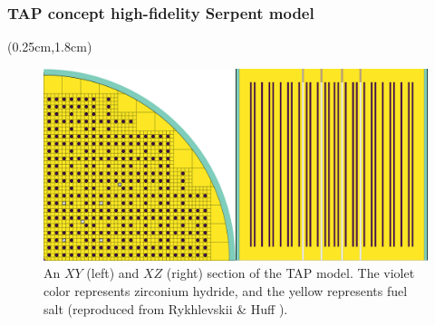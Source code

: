 \begin{frame}
\frametitle{\gls{TAP} concept high-fidelity Serpent model}
\begin{textblock*}{12.25cm}(0.25cm,1.8cm) %
	\begin{figure}[htp!] %
		\includegraphics[width=\textwidth]{./images/tap_model.png}
		\caption{An $XY$ (left) and $XZ$ (right) section of the \gls{TAP} 
		model. 
			The violet color represents
zirconium hydride, and the yellow 
			represents 
			fuel salt 
			(reproduced from Rykhlevskii \& Huff 
			\cite{rykhlevskii_milestone_2019}).}
	\end{figure}
\end{textblock*}
\end{frame}